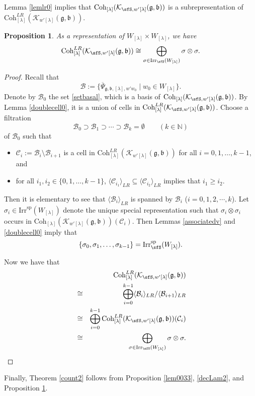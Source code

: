 \documentclass[12pt,a4paper]{amsart}
\def\subset{\subseteq}
\newcommand{\BN}{{\mathbb {N}}}
\newcommand{\CB}{{\mathcal {B}}}
\newcommand{\CC}{{\mathcal {C}}}
\newcommand{\CK}{{\mathcal {K}}}
\newcommand{\g}{\mathfrak g}
\renewcommand{\b}{\mathfrak b}
\newcommand{\la}{\langle}
\newcommand{\ra}{\rangle}
\numberwithin{equation}{section}
\newtheorem{prop}[thm]{Proposition}
\theoremstyle{remark}
\def\Irr{\mathrm{Irr}}
\def\Coh{\mathrm{Coh}}
\newcommand{\Lam}{{[\lambda]}}
\begin{document}
Lemma \ref{lemlr0} implies that $  \Coh_{\Lam}( \CK_{\sfS, w'\Lam}(\g,\b))$ is a subrepresentation of $\Coh^{LR}_{\Lam}( \CK_{w'\Lam}(\g,\b))$.
\begin{prop}\label{cohbbs}
As a representation of $W_\Lam\times W_\Lam$, we have
\[
  \Coh^{LR}_{\Lam}( \CK_{\sfS, w'\Lam}(\g,\b))\cong \bigoplus_{\sigma\in \Irr_\sfS(W_\Lam)} \sigma\otimes \sigma.
\]

\end{prop}
\begin{proof}
Recall that
\[
  \CB:= \{ \overline \Psi_{\g,\b, \Lam, w'w_0}\mid w_0\in W_\Lam\}.
\]
Denote by $\CB_0$ the set \eqref{setbasal}, which is a basis of $\Coh_{\Lam}( \CK_{\sfS, w'\Lam}(\g,\b))$. By Lemma \ref{doublecell0}, it is a union of cells in  $\Coh^{LR}_{\Lam}( \CK_{\sfS, w'\Lam}(\g,\b))$. Choose a filtration
\[
  \CB_0\supset \mathcal B_1\supset \cdots \supset \mathcal B_k=\emptyset \qquad (k\in \BN)
\]
of $\CB_0$
such that
\begin{itemize}
\item
$\mathcal C_i:=\mathcal B_i\setminus \mathcal B_{i+1}$ is a cell in $\Coh^{LR}_{\Lam}( \CK_{ w'\Lam}(\g,\b))$ for all $i=0,1, \dots, k-1$, and
\item
for all $i_1, i_2\in \{0,1, \dots, k-1\}$,   $\la \CC_{i_1}\ra_{LR} \subset \la \CC_{i_2}\ra_{LR}$ implies that $i_1\geq i_2$.
\end{itemize}
Then it is elementary to see that  $\la \CB_i\ra_{LR}$ is spanned by $\CB_i$ ($i=0, 1,2, \cdots ,k$). Let $\sigma_i\in \Irr^{\mathrm{sp}}(W_\Lam)$ denote the unique special representation such that $\sigma_i\otimes \sigma_i$ occurs in $\Coh_{\Lam}( \CK_{w'\Lam}(\g,\b))(\CC_i)$. Then Lemmas \ref{associatedv} and \ref{doublecell0} imply that
\[
\{\sigma_0, \sigma_1, \dots, \sigma_{k-1}\}= \Irr_\sfS^{\mathrm{sp}}(W_\Lam).
\]

Now we have that
\begin{eqnarray*}
   &&\Coh^{LR}_{\Lam}( \CK_{\sfS, w'\Lam}(\g,\b))\\
   &\cong & \bigoplus_{i=0}^{k-1}  \la \CB_i\ra_{LR}/\la \CB_{i+1}\ra_{LR}\\
    &\cong & \bigoplus_{i=0}^{k-1}   \Coh^{LR}_{\Lam}( \CK_{\sfS, w'\Lam}(\g,\b))(\CC_i)\\
    &\cong &\bigoplus_{\sigma\in \Irr_\sfS(W_\Lam)} \sigma\otimes \sigma.
\end{eqnarray*}
\end{proof}

Finally, Theorem \ref{count2} follows from Proposition \ref{lem0033}, \eqref{decLam2}, and Proposition \ref{cohbbs}.
\end{document}
